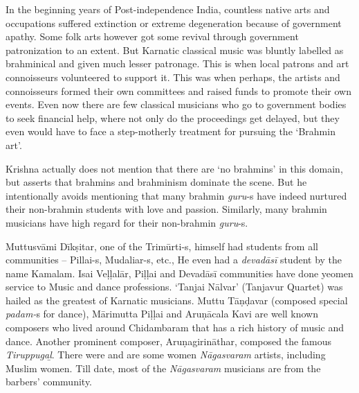 In the beginning years of Post-independence India, countless native arts and occupations suffered extinction or extreme degeneration because of government apathy. Some folk arts however got some revival through government patronization to an extent. But Karnatic classical music was bluntly labelled as brahminical and given much lesser patronage. This is when local patrons and art connoisseurs volunteered to support it. This was when perhaps, the artists and connoisseurs formed their own committees and raised funds to promote their own events. Even now there are few classical musicians who go to government bodies to seek financial help, where not only do the proceedings get delayed, but they even would have to face a step-motherly treatment for pursuing the ‘Brahmin art’.

Krishna actually does not mention that there are ‘no brahmins’ in this domain, but asserts that brahmins and brahminism dominate the scene. But he intentionally avoids mentioning that many brahmin \textit{guru}-s have indeed nurtured their non-brahmin students with love and passion. Similarly, many brahmin musicians have high regard for their non-brahmin \textit{guru}-s.

Muttusvāmi Dīkṣitar, one of the Trimūrti-s, himself had students from all communities – Pillai-s, Mudaliar-s, etc., He even had a \textit{devadāsī} student by the name Kamalam. Isai Veḷḷalār, Piḷḷai and Devadāsī communities have done yeomen service to Music and dance professions. ‘Tanjai Nālvar’ (Tanjavur Quartet) was hailed as the greatest of Karnatic musicians. Muttu Tāṇḍavar (composed special \textit{padam-}s for dance), Mārimutta Piḷḷai and Aruṇācala Kavi are well known composers who lived around Chidambaram that has a rich history of music and dance. Another prominent composer, Aruṇagirināthar, composed the famous \textit{Tiruppugaḻ}. There were and are some women \textit{Nāgasvaram} artists, including Muslim women. Till date, most of the \textit{Nāgasvaram} musicians are from the barbers’ community.

